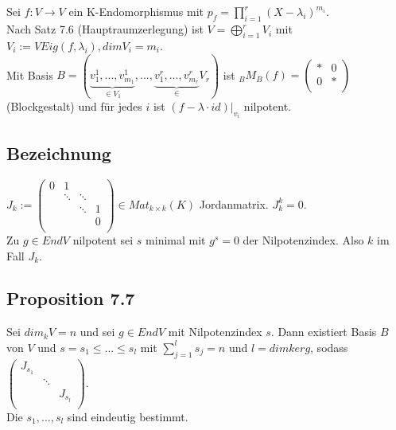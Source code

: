 \documentclass[a4paper, 12pt]{extarticle}
\begin{document}
\subsection*{}
Sei $f:V \rightarrow V$ ein K-Endomorphismus mit $p_f = \prod_{i = 1}^{r}(X-\lambda_i)^{m_i}$.\\
Nach Satz 7.6 (Hauptraumzerlegung) ist 
$V = \bigoplus_{i=1}^{r}V_i$ mit $V_i := VEig(f, \lambda_i), dim V_i = m_i$.\\
Mit Basis $B = (\underbrace{v_1^1, ... , v_{m_1}^1}_{\in V_1}, ... , \underbrace{v_1^r, ... , v_{m_r}^r}_\in V_r)$ ist ${}_BM_B(f) = \left( \begin{matrix}
	* & 0 \\
	0 & * \\
\end{matrix}\right)$ (Blockgestalt) und für jedes $i$ ist $(f-\lambda \cdot id)|_{v_i}$ nilpotent.
\subsection*{Bezeichnung}
$J_k := \left( \begin{matrix}
	0 & 1 \\
	& \ddots & \ddots \\
	& & \ddots& 1 \\
	& & & 0 \\
\end{matrix} \right) \in Mat_{k \times k}(K)$ Jordanmatrix. $J_k^k = 0.$\\
Zu $g \in EndV$ nilpotent sei $s$ minimal mit $g^s = 0$ der Nilpotenzindex. Also $k$ im Fall $J_k$.
\subsection*{Proposition 7.7}
Sei $dim_kV = n$ und sei $g\in EndV$ mit Nilpotenzindex $s$. Dann existiert Basis $B$ von $V$ und $s = s_1 \leq ... \leq s_l$ mit $\sum_{j=1}^{l}s_j = n$ und $l = dim ker g$, sodass $\left( \begin{matrix}
	J_{s_1} \\
	& \ddots \\
	& & J_{s_l}\\
\end{matrix} \right)$.\\
Die $s_1, ..., s_l$ sind eindeutig bestimmt.
\end{document}
